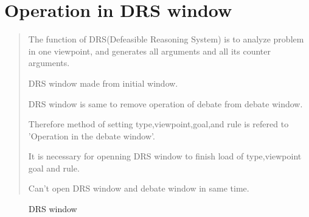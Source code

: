 \section{ Operation in DRS window}

\begin{quotation}
The function of DRS(Defeasible Reasoning System) is to analyze problem in one viewpoint,
and generates all arguments and all its counter arguments.

DRS window made from initial window.

DRS window is same to remove operation of debate from debate window.

Therefore method of setting type,viewpoint,goal,and rule is refered
to 'Operation in the debate window'.

It is necessary for openning DRS window to finish load of type,viewpoint goal and rule.

Can't open DRS window and debate window in same time.

\end{quotation}

\begin{figure}[htb]
\begin{center}
\end{center}
\caption{DRS window}\label{DRS window}
\end{figure}


